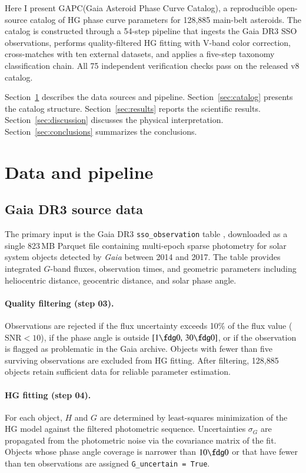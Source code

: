 \documentclass{aa}
\newcommand{\gapc}{GAPC\xspace}
\newcommand{\gaia}{{\it Gaia}\xspace}
\begin{document}
Here I present \gapc (Gaia Asteroid Phase Curve Catalog), a reproducible
open-source catalog of HG phase curve parameters for 128,885 main-belt
asteroids.  The catalog is constructed through a 54-step pipeline that
ingests the Gaia DR3 SSO observations, performs quality-filtered HG fitting
with V-band color correction, cross-matches with ten external datasets, and
applies a five-step taxonomy classification chain.  All 75 independent
verification checks pass on the released v8 catalog.

Section~\ref{sec:data} describes the data sources and pipeline.
Section~\ref{sec:catalog} presents the catalog structure.
Section~\ref{sec:results} reports the scientific results.
Section~\ref{sec:discussion} discusses the physical interpretation.
Section~\ref{sec:conclusions} summarizes the conclusions.


\section{Data and pipeline}
\label{sec:data}

\subsection{Gaia DR3 source data}
\label{sec:gaia}

The primary input is the Gaia DR3 \texttt{sso\_observation} table
\citep{tanga2023}, downloaded as a single 823\,MB Parquet file
containing multi-epoch sparse photometry for solar system objects detected
by \gaia between 2014 and 2017.  The table provides integrated $G$-band
fluxes, observation times, and geometric parameters including heliocentric
distance, geocentric distance, and solar phase angle.

\paragraph{Quality filtering (step 03).}
Observations are rejected if the flux uncertainty exceeds 10\% of the flux
value ($\mathrm{SNR} < 10$), if the phase angle is outside $[1\fdg0,\,
30\fdg0]$, or if the observation is flagged as problematic in the Gaia
archive.  Objects with fewer than five surviving observations are excluded
from HG fitting.  After filtering, 128,885 objects retain sufficient data
for reliable parameter estimation.

\paragraph{HG fitting (step 04).}
For each object, $H$ and $G$ are determined by least-squares minimization
of the HG model \citep{bowell1989} against the filtered photometric
sequence.  Uncertainties $\sigma_G$ are propagated from the photometric
noise via the covariance matrix of the fit.  Objects whose phase angle
coverage is narrower than $10\fdg0$ or that have fewer than ten
observations are assigned \texttt{G\_uncertain = True}.
\end{document}
